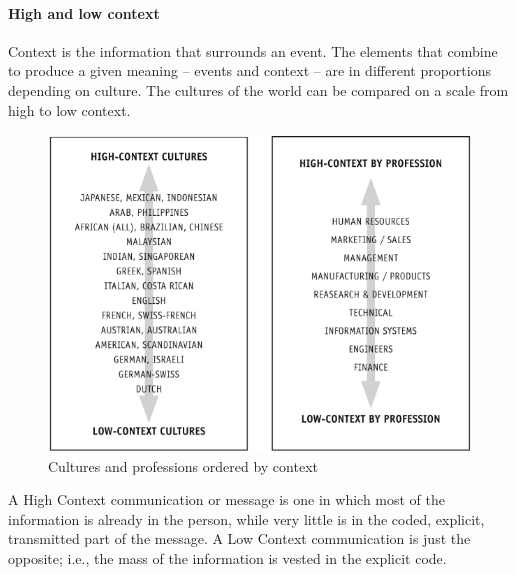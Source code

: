 \paragraph{High and low context}
Context is the information that surrounds an event. The elements that combine to produce a given meaning – events and context – are in different proportions depending on culture. The cultures of the world can be compared on a scale from high to low context.
\begin{figure}[H]
	\centering
	\includegraphics[width=.7\textwidth]{figures/contextComparison.png}
	\caption{Cultures and professions ordered by context}
\end{figure}
A High Context communication or message is one in which most of the information is already in the person, while very little is in the coded, explicit, transmitted part of the message. A Low Context communication is just the opposite; i.e., the mass of the information is vested in the explicit code.

